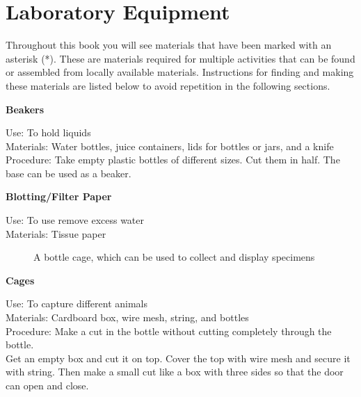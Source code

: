 \chapter{Laboratory Equipment}
Throughout this book you will see materials that have been marked with an asterisk (*). These are materials required for multiple activities that can be found or assembled from locally available materials. Instructions for finding and making these materials are listed below to avoid repetition in the following sections.

\begin{flushleft}
\textbf{Beakers}
\end{flushleft}
\vspace{-10pt}
Use: To hold liquids\\
Materials: Water bottles, juice containers, lids for bottles or jars, and a knife\\
Procedure: Take empty plastic bottles of different sizes. Cut them in half. The base can be used as a beaker.\\


\begin{flushleft}
\textbf{Blotting/Filter Paper}
\end{flushleft}
\vspace{-10pt}
Use: To use remove excess water\\
Materials: Tissue paper \\

\begin{figure}[h]
\begin{center}
\def\svgwidth{2.5cm}

\caption{A bottle cage, which can be used to collect and display specimens}
\label{fig:bottle-cage}
\end{center}
\end{figure}

\begin{flushleft}
\textbf{Cages}
\end{flushleft}
\vspace{-10pt}
Use: To capture different animals\\
Materials: Cardboard box, wire mesh, string, and bottles\\
Procedure: Make a cut in the bottle without cutting completely through the bottle.\\Get an empty box and cut it on top. Cover the top with wire mesh and secure it with string. Then make a small cut like a box with three sides so that the door can open and close.  

